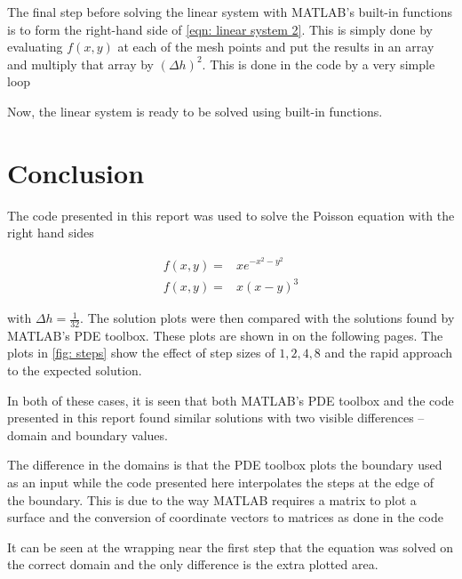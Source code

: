 \documentclass[10pt,a4paper]{article}
\begin{document}
The final step before solving the linear system with MATLAB's built-in functions is to form the right-hand side of \cref{eqn: linear system 2}. This is simply done by evaluating $f(x,y)$ at each of the mesh points and put the results in an array and multiply that array by $\left( \Delta h \right)^2$. This is done in the code by a very simple loop



Now, the linear system is ready to be solved using built-in functions.

\section*{Conclusion}

The code presented in this report was used to solve the Poisson equation with the right hand sides

\begin{subequations}
\begin{align}
f(x, y) =& x e^{-x^2 - y^2} \label{eqn: gaussian}\\
f(x, y) =& x \left( x - y \right)^3 \label{eqn: cubic}
\end{align}
\end{subequations}

with $\Delta h = \frac{1}{32}$. The solution plots were then compared with the solutions found by MATLAB's PDE toolbox. These plots are shown in  on the following pages. The plots in \cref{fig: steps} show the effect of step sizes of $1, 2, 4, 8$ and the rapid approach to the expected solution.

In both of these cases, it is seen that both MATLAB's PDE toolbox and the code presented in this report found similar solutions with two visible differences -- domain and boundary values.

The difference in the domains is that the PDE toolbox plots the boundary used as an input while the code presented here interpolates the steps at the edge of the boundary. This is due to the way MATLAB requires a matrix to plot a surface and the conversion of coordinate vectors to matrices as done in the code



It can be seen  at the wrapping near the first step that the equation was solved on the correct domain and the only difference is the extra plotted area.
\end{document}

